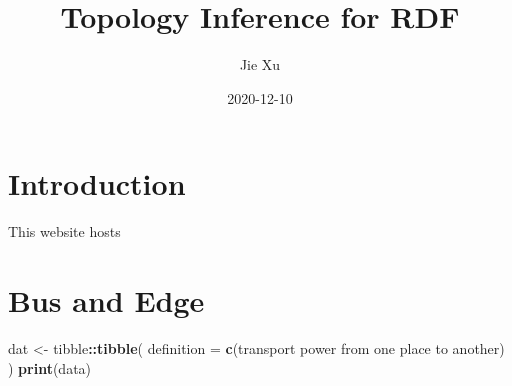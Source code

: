 \documentclass[
]{book}
\title{Topology Inference for RDF}
\author{Jie Xu}
\date{2020-12-10}
\newenvironment{Shaded}{\begin{snugshade}}{\end{snugshade}}
\newcommand{\DataTypeTok}[1]{\textcolor[rgb]{0.13,0.29,0.53}{#1}}
\newcommand{\KeywordTok}[1]{\textcolor[rgb]{0.13,0.29,0.53}{\textbf{#1}}}
\newcommand{\NormalTok}[1]{#1}
\newcommand{\OperatorTok}[1]{\textcolor[rgb]{0.81,0.36,0.00}{\textbf{#1}}}
\newcommand{\StringTok}[1]{\textcolor[rgb]{0.31,0.60,0.02}{#1}}
\begin{document}
\maketitle

{
\setcounter{tocdepth}{1}
\tableofcontents
}
\hypertarget{introduction}{%
\chapter{Introduction}\label{introduction}}

This website hosts

\hypertarget{bus-edge}{%
\chapter{Bus and Edge}\label{bus-edge}}

\begin{Shaded}
\begin{Highlighting}[]
\NormalTok{dat \textless{}{-}}\StringTok{ }\NormalTok{tibble}\OperatorTok{::}\KeywordTok{tibble}\NormalTok{(}
  \DataTypeTok{definition =} \KeywordTok{c}\NormalTok{(}\StringTok{\textquotesingle{}transport power from one place to another\textquotesingle{}}\NormalTok{)}
\NormalTok{)}
\KeywordTok{print}\NormalTok{(data)}
\end{Highlighting}
\end{Shaded}
\end{document}
